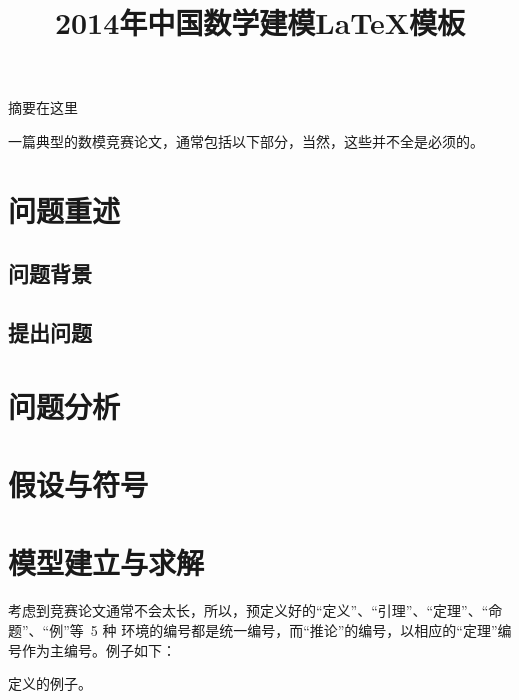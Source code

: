\documentclass{cumcmart}
\begin{document}
\title{2014年中国数学建模\LaTeX{}模板}




\maketitle
\begin{cnabstract}%

摘要在这里


\end{cnabstract}

\newpage


一篇典型的数模竞赛论文，通常包括以下部分，当然，这些并不全是必须的。
\section{问题重述}
\subsection{问题背景}
\subsection{提出问题}

\section{问题分析}
\section{假设与符号}
\section{模型建立与求解}
    考虑到竞赛论文通常不会太长，所以，预定义好的“定义”、“引理”、“定理”、“命题”、“例”等~5 种
环境的编号都是统一编号，而“推论”的编号，以相应的“定理”编号作为主编号。例子如下：

\begin{definition}
  定义的例子。
\end{definition}
\end{document}

